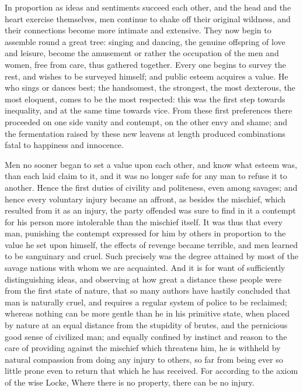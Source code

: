 \documentclass[11pt,twocolumn]{ltugboat}
\begin{document}
In proportion as ideas and sentiments succeed each other, and the head
and the heart exercise themselves, men continue to shake off their
original wildness, and their connections become more intimate and
extensive. They now begin to assemble round a great tree: singing and
dancing, the genuine offspring of love and leisure, become the
amusement or rather the occupation of the men and women, free from
care, thus gathered together. Every one begins to survey the rest, and
wishes to be surveyed himself; and public esteem acquires a value. He
who sings or dances best; the handsomest, the strongest, the most
dexterous, the most eloquent, comes to be the most respected: this was
the first step towards inequality, and at the same time towards vice.
From these first preferences there proceeded on one side vanity and
contempt, on the other envy and shame; and the fermentation raised by
these new leavens at length produced combinations fatal to happiness
and innocence.

Men no sooner began to set a value upon each other, and know what
esteem was, than each laid claim to it, and it was no longer safe for
any man to refuse it to another. Hence the first duties of civility
and politeness, even among savages; and hence every voluntary injury
became an affront, as besides the mischief, which resulted from it as
an injury, the party offended was sure to find in it a contempt for
his person more intolerable than the mischief itself. It was thus that
every man, punishing the contempt expressed for him by others in
proportion to the value he set upon himself, the effects of revenge
became terrible, and men learned to be sanguinary and cruel. Such
precisely was the degree attained by most of the savage nations with
whom we are acquainted. And it is for want of sufficiently
distinguishing ideas, and observing at how great a distance these
people were from the first state of nature, that so many authors have
hastily concluded that man is naturally cruel, and requires a regular
system of police to be reclaimed; whereas nothing can be more gentle
than he in his primitive state, when placed by nature at an equal
distance from the stupidity of brutes, and the pernicious good sense
of civilized man; and equally confined by instinct and reason to the
care of providing against the mischief which threatens him, he is
withheld by natural compassion from doing any injury to others, so far
from being ever so little prone even to return that which he has
received. For according to the axiom of the wise Locke, Where there is
no property, there can be no injury.
\end{document}
